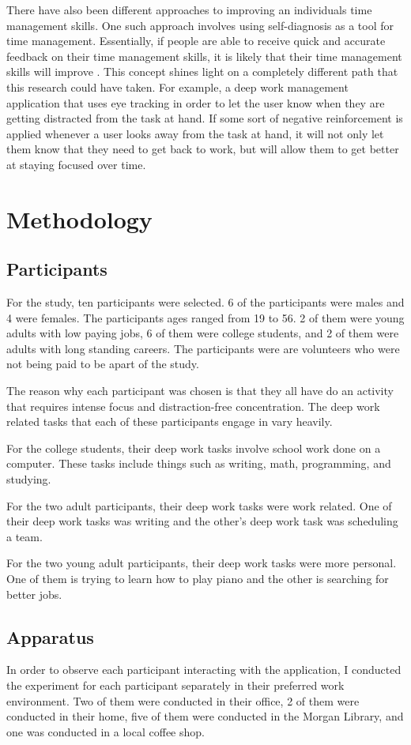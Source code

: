 \documentclass[sigconf]{acmart}
\begin{document}
There have also been different approaches to improving an individuals time management skills. One such approach involves using self-diagnosis as a tool for time management. Essentially, if people are able to receive quick and accurate feedback on their time management skills, it is likely that their time management skills will improve \cite{self}. This concept shines light on a completely different path that this research could have taken. For example, a deep work management application that uses eye tracking in order to let the user know when they are getting distracted from the task at hand. If some sort of negative reinforcement is applied whenever a user looks away from the task at hand, it will not only let them know that they need to get back to work, but will allow them to get better at staying focused over time\cite{negative}.

\section{Methodology}
\subsection{Participants}
For the study, ten participants were selected. 6 of the participants were males and 4 were females. The participants ages ranged from 19 to 56. 2 of them were young adults with low paying jobs, 6 of them were college students, and 2 of them were adults with long standing careers. The participants were are volunteers who were not being paid to be apart of the study.

The reason why each participant was chosen is that they all have do an activity that requires intense focus and distraction-free concentration. The deep work related tasks that each of these participants engage in vary heavily. 

For the college students, their deep work tasks involve school work done on a computer. These tasks include things such as writing, math, programming, and studying.

For the two adult participants, their deep work tasks were work related. One of their deep work tasks was writing and the other's deep work task was scheduling a team. 

For the two young adult participants, their deep work tasks were more personal. One of them is trying to learn how to play piano and the other is searching for better jobs. 

\subsection{Apparatus}
In order to observe each participant interacting with the application, I conducted the experiment for each participant separately in their preferred work environment. Two of them were conducted in their office, 2 of them were conducted in their home, five of them were conducted in the Morgan Library, and one was conducted in a local coffee shop. 
\end{document}
